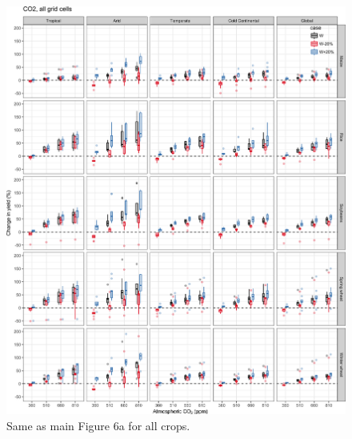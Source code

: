 \documentclass[10pt]{article}
\begin{document}
\begin{figure}[h!]
    \centering
    \includegraphics[width=\textwidth]{s_sim_CG_C.png}
    \caption{Same as main Figure 6a for all crops.}
    \label{fig:carbon}
\end{figure}
\end{document}
